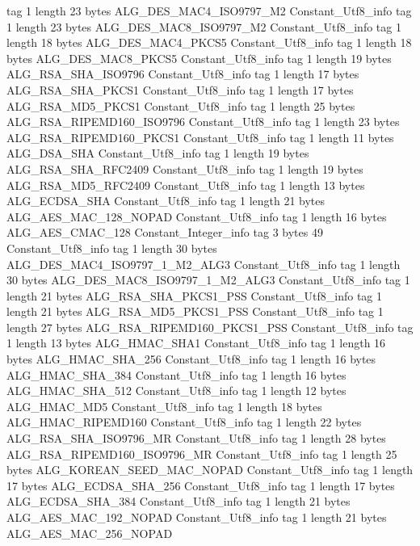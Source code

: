 {{{			tag	1
			length	23
			bytes	ALG_DES_MAC4_ISO9797_M2
		}
		Constant_Utf8_info {
			tag	1
			length	23
			bytes	ALG_DES_MAC8_ISO9797_M2
		}
		Constant_Utf8_info {
			tag	1
			length	18
			bytes	ALG_DES_MAC4_PKCS5
		}
		Constant_Utf8_info {
			tag	1
			length	18
			bytes	ALG_DES_MAC8_PKCS5
		}
		Constant_Utf8_info {
			tag	1
			length	19
			bytes	ALG_RSA_SHA_ISO9796
		}
		Constant_Utf8_info {
			tag	1
			length	17
			bytes	ALG_RSA_SHA_PKCS1
		}
		Constant_Utf8_info {
			tag	1
			length	17
			bytes	ALG_RSA_MD5_PKCS1
		}
		Constant_Utf8_info {
			tag	1
			length	25
			bytes	ALG_RSA_RIPEMD160_ISO9796
		}
		Constant_Utf8_info {
			tag	1
			length	23
			bytes	ALG_RSA_RIPEMD160_PKCS1
		}
		Constant_Utf8_info {
			tag	1
			length	11
			bytes	ALG_DSA_SHA
		}
		Constant_Utf8_info {
			tag	1
			length	19
			bytes	ALG_RSA_SHA_RFC2409
		}
		Constant_Utf8_info {
			tag	1
			length	19
			bytes	ALG_RSA_MD5_RFC2409
		}
		Constant_Utf8_info {
			tag	1
			length	13
			bytes	ALG_ECDSA_SHA
		}
		Constant_Utf8_info {
			tag	1
			length	21
			bytes	ALG_AES_MAC_128_NOPAD
		}
		Constant_Utf8_info {
			tag	1
			length	16
			bytes	ALG_AES_CMAC_128
		}
		Constant_Integer_info {
			tag	3
			bytes	49
		}
		Constant_Utf8_info {
			tag	1
			length	30
			bytes	ALG_DES_MAC4_ISO9797_1_M2_ALG3
		}
		Constant_Utf8_info {
			tag	1
			length	30
			bytes	ALG_DES_MAC8_ISO9797_1_M2_ALG3
		}
		Constant_Utf8_info {
			tag	1
			length	21
			bytes	ALG_RSA_SHA_PKCS1_PSS
		}
		Constant_Utf8_info {
			tag	1
			length	21
			bytes	ALG_RSA_MD5_PKCS1_PSS
		}
		Constant_Utf8_info {
			tag	1
			length	27
			bytes	ALG_RSA_RIPEMD160_PKCS1_PSS
		}
		Constant_Utf8_info {
			tag	1
			length	13
			bytes	ALG_HMAC_SHA1
		}
		Constant_Utf8_info {
			tag	1
			length	16
			bytes	ALG_HMAC_SHA_256
		}
		Constant_Utf8_info {
			tag	1
			length	16
			bytes	ALG_HMAC_SHA_384
		}
		Constant_Utf8_info {
			tag	1
			length	16
			bytes	ALG_HMAC_SHA_512
		}
		Constant_Utf8_info {
			tag	1
			length	12
			bytes	ALG_HMAC_MD5
		}
		Constant_Utf8_info {
			tag	1
			length	18
			bytes	ALG_HMAC_RIPEMD160
		}
		Constant_Utf8_info {
			tag	1
			length	22
			bytes	ALG_RSA_SHA_ISO9796_MR
		}
		Constant_Utf8_info {
			tag	1
			length	28
			bytes	ALG_RSA_RIPEMD160_ISO9796_MR
		}
		Constant_Utf8_info {
			tag	1
			length	25
			bytes	ALG_KOREAN_SEED_MAC_NOPAD
		}
		Constant_Utf8_info {
			tag	1
			length	17
			bytes	ALG_ECDSA_SHA_256
		}
		Constant_Utf8_info {
			tag	1
			length	17
			bytes	ALG_ECDSA_SHA_384
		}
		Constant_Utf8_info {
			tag	1
			length	21
			bytes	ALG_AES_MAC_192_NOPAD
		}
		Constant_Utf8_info {
			tag	1
			length	21
			bytes	ALG_AES_MAC_256_NOPAD
}}}
